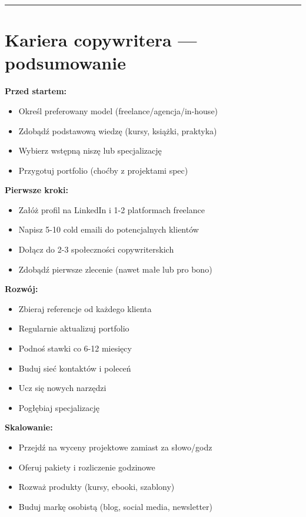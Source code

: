 \documentclass[
  12pt,
  a4paper,
  twoside,
  openright,
  12pt,
  DIV=12,
  BCOR=12mm]{scrbook}
\providecommand{\tightlist}{%
  \setlength{\itemsep}{0pt}\setlength{\parskip}{0pt}}\usepackage{longtable,booktabs,array}
\newcommand{\decoline}{%
  \begin{center}
    \textcolor{bordergray}{\rule{0.3\textwidth}{0.5pt}}
  \end{center}
}
\begin{document}
\decoline

\section{Kariera copywritera ---
podsumowanie}\label{kariera-copywritera-podsumowanie}

\textbf{Przed startem:}

\begin{itemize}
\tightlist
\item[$\square$]
  Określ preferowany model (freelance/agencja/in-house)
\item[$\square$]
  Zdobądź podstawową wiedzę (kursy, książki, praktyka)
\item[$\square$]
  Wybierz wstępną niszę lub specjalizację
\item[$\square$]
  Przygotuj portfolio (choćby z projektami spec)
\end{itemize}

\textbf{Pierwsze kroki:}

\begin{itemize}
\tightlist
\item[$\square$]
  Załóż profil na LinkedIn i 1-2 platformach freelance
\item[$\square$]
  Napisz 5-10 cold emaili do potencjalnych klientów
\item[$\square$]
  Dołącz do 2-3 społeczności copywriterskich
\item[$\square$]
  Zdobądź pierwsze zlecenie (nawet małe lub pro bono)
\end{itemize}

\textbf{Rozwój:}

\begin{itemize}
\tightlist
\item[$\square$]
  Zbieraj referencje od każdego klienta
\item[$\square$]
  Regularnie aktualizuj portfolio
\item[$\square$]
  Podnoś stawki co 6-12 miesięcy
\item[$\square$]
  Buduj sieć kontaktów i poleceń
\item[$\square$]
  Ucz się nowych narzędzi
\item[$\square$]
  Pogłębiaj specjalizację
\end{itemize}

\textbf{Skalowanie:}

\begin{itemize}
\tightlist
\item[$\square$]
  Przejdź na wyceny projektowe zamiast za słowo/godz
\item[$\square$]
  Oferuj pakiety i rozliczenie godzinowe
\item[$\square$]
  Rozważ produkty (kursy, ebooki, szablony)
\item[$\square$]
  Buduj markę osobistą (blog, social media, newsletter)
\end{itemize}
\end{document}

